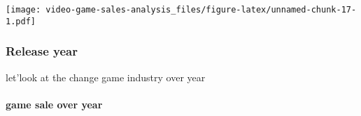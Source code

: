 \documentclass[]{article}
\newenvironment{Shaded}{\begin{snugshade}}{\end{snugshade}}
\newcommand{\DataTypeTok}[1]{\textcolor[rgb]{0.13,0.29,0.53}{#1}}
\newcommand{\DecValTok}[1]{\textcolor[rgb]{0.00,0.00,0.81}{#1}}
\newcommand{\KeywordTok}[1]{\textcolor[rgb]{0.13,0.29,0.53}{\textbf{#1}}}
\newcommand{\NormalTok}[1]{#1}
\newcommand{\OperatorTok}[1]{\textcolor[rgb]{0.81,0.36,0.00}{\textbf{#1}}}
\newcommand{\StringTok}[1]{\textcolor[rgb]{0.31,0.60,0.02}{#1}}
\let\oldparagraph\paragraph
\renewcommand{\paragraph}[1]{\oldparagraph{#1}\mbox{}}
\begin{document}
\begin{Shaded}
\end{Shaded}

\texttt{[image: video-game-sales-analysis\_files/figure-latex/unnamed-chunk-17-1.pdf]}

\hypertarget{release-year}{%
\subsubsection{Release year}\label{release-year}}

let'look at the change game industry over year

\hypertarget{game-sale-over-year}{%
\paragraph{game sale over year}\label{game-sale-over-year}}
\end{document}
